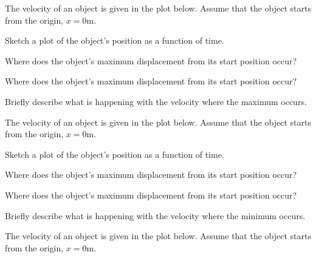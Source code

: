 \begin{problem}
\item The velocity of an object is given in the plot below. Assume
  that the object starts from the origin, $x=0$m.

  \scalebox{0.7}{}

  \begin{subproblem}
  \item Sketch a plot of the object's position as a function of time.
  \item Where does the object's maximum displacement from its start
    position occur?
    \vspace{3em}
  \item Where does the object's maximum displacement from its start
    position occur?
    \vspace{3em}
  \item Briefly describe what is happening with the velocity where the
    maximum occurs.
    \vfill
  \end{subproblem}

  \clearpage

\item The velocity of an object is given in the plot below. Assume
  that the object starts from the origin, $x=0$m.

  \scalebox{0.7}{}

  \begin{subproblem}
  \item Sketch a plot of the object's position as a function of time.
  \item Where does the object's maximum displacement from its start
    position occur?
    \vspace{3em}
  \item Where does the object's maximum displacement from its start
    position occur?
    \vspace{3em}
  \item Briefly describe what is happening with the velocity where the
    minimum occurs.
    \vfill
  \end{subproblem}

\item The velocity of an object is given in the plot below. Assume
  that the object starts from the origin, $x=0$m.

  \scalebox{0.7}{}


\end{problem}
